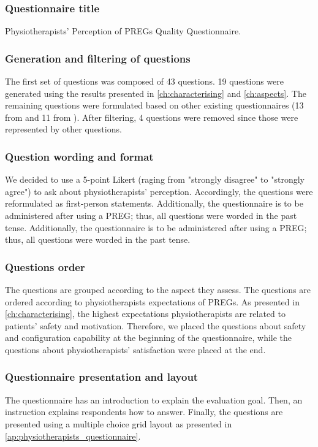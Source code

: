 \subsubsection*{Questionnaire title}
Physiotherapists' Perception of \acp{PREG} Quality Questionnaire.

\subsubsection*{Generation and filtering of questions}
The first set of questions was composed of 43 questions. 19 questions were generated using the results presented in \autoref{ch:characterising} and \autoref{ch:aspects}. The remaining questions were formulated based on other existing questionnaires (13 from \autocite{lund2001measuring} and 11 from \autocite{Laugwitz2008}). After filtering, 4 questions were removed since those were represented by other questions.

\subsubsection*{Question wording and format}
We decided to use a 5-point Likert (raging from "strongly disagree" to "strongly agree") to ask about physiotherapists' perception. Accordingly, the questions were reformulated as first-person statements. Additionally, the questionnaire is to be administered after using a \ac{PREG}; thus, all questions were worded in the past tense. Additionally, the questionnaire is to be administered after using a \ac{PREG}; thus, all questions were worded in the past tense.

\subsubsection*{Questions order}
The questions are grouped according to the aspect they assess. The questions are ordered according to physiotherapists expectations of \acp{PREG}. As presented in \autoref{ch:characterising}, the highest expectations physiotherapists are related to patients' safety and motivation. Therefore, we placed the questions about safety and configuration capability at the beginning of the questionnaire, while the questions about physiotherapists' satisfaction were placed at the end.

\subsubsection*{Questionnaire presentation and layout}
The questionnaire has an introduction to explain the evaluation goal. Then, an instruction explains respondents how to answer. Finally, the questions are presented using a multiple choice grid layout as presented in \autoref{ap:physiotherapists_questionnaire}.

